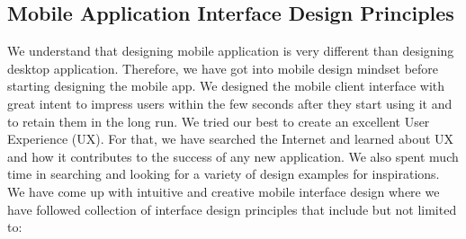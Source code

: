 \documentclass{article}
\begin{document}
\subsection{Mobile Application Interface Design Principles}
We understand that designing mobile application is very different than designing desktop application.
Therefore, we have got into mobile design mindset before starting designing the mobile app.
We designed the mobile client interface with great intent to impress users within the few seconds after they start using it and to retain them in the long run. We tried our best to create an excellent User Experience (UX). For that, we have searched the Internet and learned about UX and how it contributes to the success of any new application. We also spent much time in searching and looking for a variety of design examples for inspirations. We have come up with intuitive and creative mobile interface design where we have followed collection of interface design principles that include but not limited to:
\end{document}
